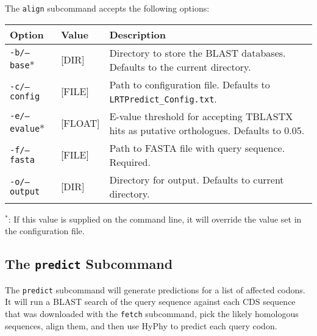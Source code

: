 \documentclass[12pt]{article}
\begin{document}
\par The \texttt{align} subcommand accepts the following options:
\begin{table}[H]
    \centering
    \begin{tabular}{p{105pt} l p{260pt}}
    \toprule
    Option & Value & Description \\
    \midrule
    \texttt{-b/--base}* & [DIR] & Directory to store the BLAST databases. Defaults to the current directory.\\
    \midrule
    \texttt{-c/--config} & [FILE] & Path to configuration file. Defaults to \texttt{LRTPredict\_Config.txt}. \\
    \midrule
    \texttt{-e/--evalue}* & [FLOAT] & E-value threshold for accepting TBLASTX hits as putative orthologues. Defaults to 0.05.\\
    \midrule
    \texttt{-f/--fasta} & [FILE] & Path to FASTA file with query sequence. Required.\\
    \midrule
    \texttt{-o/--output} & [DIR] & Directory for output. Defaults to current directory.\\
    \bottomrule
    \end{tabular}
\end{table}
\par $^*$: If this value is supplied on the command line, it will override
the value set in the configuration file.

\subsection*{The \texttt{predict} Subcommand}
\par The \texttt{predict} subcommand will generate predictions for a list of
affected codons. It will run a BLAST search of the query sequence against each
CDS sequence that was downloaded with the \texttt{fetch} subcommand, pick the
likely homologous sequences, align them, and then use HyPhy to predict each
query codon.
\end{document}
